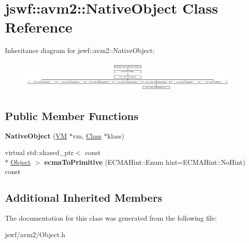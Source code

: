 \hypertarget{classjswf_1_1avm2_1_1_native_object}{\section{jswf\+:\+:avm2\+:\+:Native\+Object Class Reference}
\label{classjswf_1_1avm2_1_1_native_object}
}
Inheritance diagram for jswf\+:\+:avm2\+:\+:Native\+Object\+:\begin{figure}[H]
\begin{center}
\leavevmode
\includegraphics[height=1.632653cm]{classjswf_1_1avm2_1_1_native_object}
\end{center}
\end{figure}
\subsection*{Public Member Functions}
\begin{DoxyCompactItemize}
\item 
\hypertarget{classjswf_1_1avm2_1_1_native_object_a0bd86d5ad15cc3b4ffcc88ece5024f04}{{\bfseries Native\+Object} (\hyperlink{classjswf_1_1avm2_1_1_v_m}{V\+M} $\ast$vm, \hyperlink{classjswf_1_1avm2_1_1_class}{Class} $\ast$klass)}\label{classjswf_1_1avm2_1_1_native_object_a0bd86d5ad15cc3b4ffcc88ece5024f04}

\item 
\hypertarget{classjswf_1_1avm2_1_1_native_object_a275a3cd12c6c195d51731deace28fcad}{virtual std\+::shared\+\_\+ptr$<$ const \\*
\hyperlink{classjswf_1_1avm2_1_1_object}{Object} $>$ {\bfseries ecma\+To\+Primitive} (E\+C\+M\+A\+Hint\+::\+Enum hint=E\+C\+M\+A\+Hint\+::\+No\+Hint) const }\label{classjswf_1_1avm2_1_1_native_object_a275a3cd12c6c195d51731deace28fcad}

\end{DoxyCompactItemize}
\subsection*{Additional Inherited Members}


The documentation for this class was generated from the following file\+:\begin{DoxyCompactItemize}
\item 
jswf/avm2/Object.\+h\end{DoxyCompactItemize}
